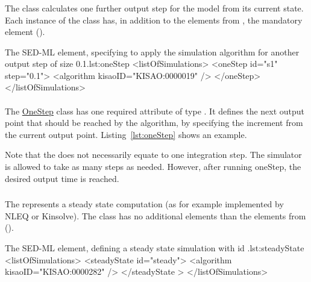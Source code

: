 \subsubsection{}
\label{class:oneStep}

The  class calculates one further output step for the model from its current state. Each instance of the  class has, in addition to the elements from \Simulation, the mandatory element \hyperref[sec:step]{} ().


\begin{myXmlLst}{The SED-ML  element, specifying to apply the simulation algorithm for another output step of size 0.1.}{lst:oneStep}
<listOfSimulations> 
	<oneStep id="s1" step="0.1"> 
		<algorithm kisaoID="KISAO:0000019" />
	</oneStep> 
</listOfSimulations>
\end{myXmlLst}

\paragraph*{}
\label{sec:step}
The \hyperref[class:oneStep]{OneStep} class has one required attribute  of type . It defines the next output point that should be reached by the algorithm, by specifying the increment from the current output point. Listing~\ref{lst:oneStep} shows an example. 

Note that the  does not necessarily equate to one integration step. The simulator is allowed to take as many steps as needed. However, after running oneStep, the desired output time is reached.


\subsubsection{}
\label{class:steadyState}
The  represents a steady state computation (as for example implemented by NLEQ or Kinsolve). The  class has no additional elements than the elements from \Simulation ().


\begin{myXmlLst}{The SED-ML  element, defining a steady state simulation with id .}{lst:steadyState}
<listOfSimulations>
	<steadyState id="steady"> 
		<algorithm kisaoID="KISAO:0000282" />
	</steadyState > 
</listOfSimulations>
\end{myXmlLst}


